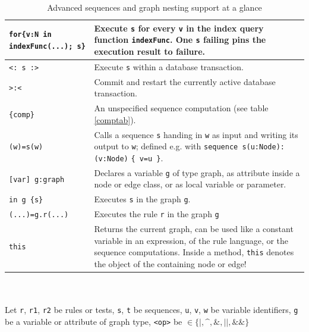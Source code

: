 \begin{table}[htbp]
\begin{minipage}{\linewidth}
\begin{tabularx}{\linewidth}{|lX|}
\texttt{for\{v:N in indexFunc(...); s\}} & Execute \texttt{s} for every \texttt{v} in the index query function \texttt{indexFunc}. One \texttt{s} failing pins the execution result to failure.\\
\hline
\texttt{<: s :>} & Execute \texttt{s} within a database transaction.\\
\texttt{>:<} & Commit and restart the currently active database transaction.\\
\hline
\texttt{\{comp\}}	& An unspecified sequence computation (see table \ref{comptab}).\\
\hline
\texttt{(w)=s(w)} & Calls a sequence \texttt{s} handing in \texttt{w} as input and writing its output to \texttt{w}; defined e.g. with \texttt{sequence s(u:Node):(v:Node)} \texttt{\{ v=u \}}.\\
\hline
\hline
\texttt{[var] g:graph}	& Declares a variable \texttt{g} of type graph, as attribute inside a node or edge class, or as local variable or parameter.\\
\hline
\texttt{in g \{s\}}	& Executes \texttt{s} in the graph \texttt{g}.\\
\hline
\texttt{(...)=g.r(...)} & Executes the rule \texttt{r} in the graph \texttt{g}\\
\hline
\texttt{this} & Returns the current graph, can be used like a constant variable in an expression, of the rule language, or the sequence computations. Inside a method, \texttt{this} denotes the object of the containing node or edge!\\
\hline
\end{tabularx}\indexmain{\texttt{<>}}\indexmain{\texttt{<<;>>}}
\end{minipage}\\
\\ 
{\small Let \texttt{r}, \texttt{r1}, \texttt{r2} be rules or tests, \texttt{s}, \texttt{t} be sequences, \texttt{u}, \texttt{v}, \texttt{w} be variable identifiers, \texttt{g} be a variable or attribute of graph type, \texttt{<op>} be $\in \{\texttt{|}, \texttt{\textasciicircum}, \texttt{\&}, \texttt{||}, \texttt{\&\&}\}$ }%
\caption{Advanced sequences and graph nesting support at a glance}
\label{seqtab}
\end{table}
 
